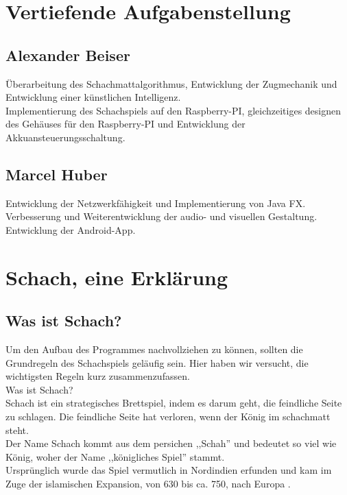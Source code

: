 \documentclass[12pt,a4paper]{article}
\begin{document}
{	\newpage
\section{Vertiefende Aufgabenstellung}
 \subsection{Alexander Beiser}
 	Überarbeitung des Schachmattalgorithmus, Entwicklung der Zugmechanik und Entwicklung einer künstlichen Intelligenz. \\
Implementierung des Schachspiels auf den Raspberry-PI, gleichzeitiges designen des Gehäuses für den Raspberry-PI und Entwicklung der Akkuansteuerungsschaltung. 
	
 \subsection{Marcel Huber}
	Entwicklung der Netzwerkfähigkeit und Implementierung von Java FX.
Verbesserung und Weiterentwicklung der audio- und visuellen Gestaltung.
Entwicklung der Android-App.


\clearpage\vfill\newpage{}

\section{Schach, eine Erklärung}
\label{SEC:CHESS}

\subsection{Was ist Schach?}
\label{SUBSEC:CHESS-EXPLAIN}
Um den Aufbau des Programmes nachvollziehen zu können, sollten die Grundregeln des Schachspiels geläufig sein. Hier haben wir versucht, die wichtigsten Regeln kurz zusammenzufassen. \\
Was ist Schach? \\
Schach ist ein strategisches Brettspiel, indem es darum geht, die feindliche Seite zu schlagen. Die feindliche Seite hat verloren, wenn der König im schachmatt steht. \\
Der Name Schach kommt aus dem persichen ,,Schah'' und bedeutet so viel wie König, woher der Name ,,königliches Spiel'' stammt. \\
Ursprünglich wurde das Spiel vermutlich in Nordindien erfunden und kam im Zuge der islamischen Expansion, von 630 bis ca. 750, nach Europa \cite{wiki:chess}.


}
\end{document}
